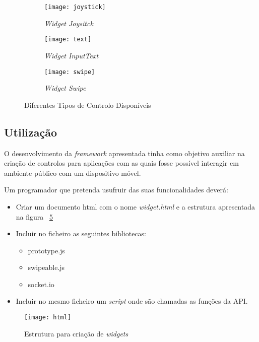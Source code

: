 	\begin{figure}[ht]
	  \centering
	  \leavevmode
	  \begin{subfigure}{.33\textwidth}
	    \centering
	    \texttt{[image: joystick]}
	    \caption{\textit{Widget Joysitck}}
	    \label{fig:joystick}
	  \end{subfigure}%
	  \begin{subfigure}{.33\textwidth}
	    \centering
	    \texttt{[image: text]}
	    \caption{\textit{Widget InputText}}
	    \label{fig:inputext}
	  \end{subfigure}%
	   \begin{subfigure}{.33\textwidth}
	    \centering
	    \texttt{[image: swipe]}
	    \caption{\textit{Widget Swipe}}
	    \label{fig:swipe}
	  \end{subfigure}
	  \caption{Diferentes Tipos de Controlo Disponíveis}
	  \label{fig:widgets}
	\end{figure}

\pagebreak

\subsection{Utilização}

	O desenvolvimento da \textit{framework} apresentada tinha como objetivo auxiliar na criação de controlos para aplicações com as quais fosse possível interagir em ambiente público com um dispositivo móvel.

	Um programador que pretenda usufruir das suas funcionalidades deverá:

	\begin{itemize}
		\item Criar um documento html com o nome \textit{widget.html} e a estrutura apresentada na figura ~\ref{fig:html_struct}
		\item Incluir no ficheiro as seguintes bibliotecas:
			\begin{itemize}
			\item prototype.js 
			\item swipeable.js
			\item socket.io
			\end{itemize}
		\item Incluir no mesmo ficheiro um \textit{script}
		 onde são chamadas as funções da API.
	\end{itemize}

	\begin{figure}[ht]
		\centering
		\texttt{[image: html]}
		\caption[Estrutura html] {Estrutura para criação de \textit{widgets}}
		\label{fig:html_struct}
	\end{figure}

